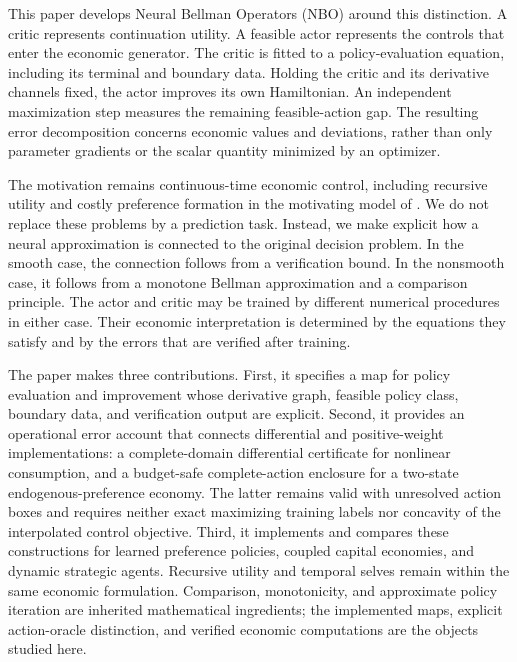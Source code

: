 \documentclass[ecta,draft]{econsocart}
\theoremstyle{definition}
\theoremstyle{remark}
\begin{document}
This paper develops Neural Bellman Operators (NBO) around this distinction. A critic represents continuation utility. A feasible actor represents the controls that enter the economic generator. The critic is fitted to a policy-evaluation equation, including its terminal and boundary data. Holding the critic and its derivative channels fixed, the actor improves its own Hamiltonian. An independent maximization step measures the remaining feasible-action gap. The resulting error decomposition concerns economic values and deviations, rather than only parameter gradients or the scalar quantity minimized by an optimizer.

The motivation remains continuous-time economic control, including recursive utility and costly preference formation in the motivating model of \citet{qi2025}. We do not replace these problems by a prediction task. Instead, we make explicit how a neural approximation is connected to the original decision problem. In the smooth case, the connection follows from a verification bound. In the nonsmooth case, it follows from a monotone Bellman approximation and a comparison principle. The actor and critic may be trained by different numerical procedures in either case. Their economic interpretation is determined by the equations they satisfy and by the errors that are verified after training.

The paper makes three contributions. First, it specifies a map for policy evaluation and improvement whose derivative graph, feasible policy class, boundary data, and verification output are explicit. Second, it provides an operational error account that connects differential and positive-weight implementations: a complete-domain differential certificate for nonlinear consumption, and a budget-safe complete-action enclosure for a two-state endogenous-preference economy. The latter remains valid with unresolved action boxes and requires neither exact maximizing training labels nor concavity of the interpolated control objective. Third, it implements and compares these constructions for learned preference policies, coupled capital economies, and dynamic strategic agents. Recursive utility and temporal selves remain within the same economic formulation. Comparison, monotonicity, and approximate policy iteration are inherited mathematical ingredients; the implemented maps, explicit action-oracle distinction, and verified economic computations are the objects studied here.
\end{document}
